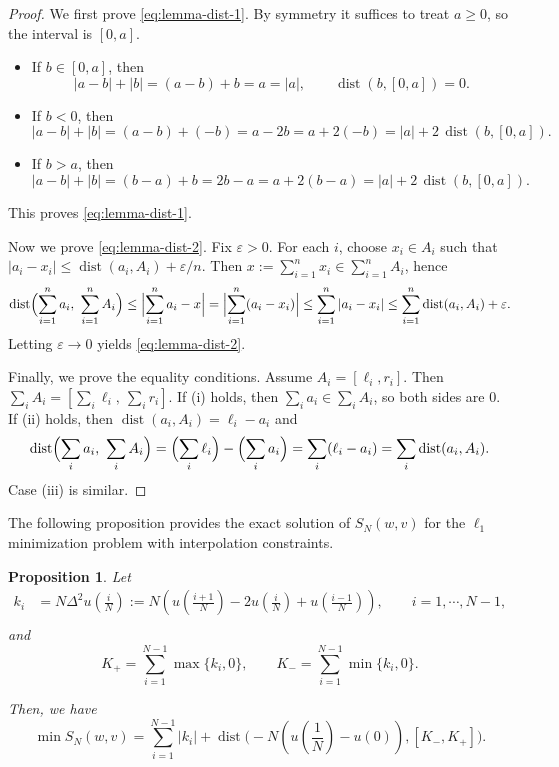 \documentclass[12pt]{amsart}
\numberwithin{equation}{section}
\newtheorem{proposition}{Proposition}[section]
\theoremstyle{remark}
\begin{document}
\begin{proof}
We first prove \eqref{eq:lemma-dist-1}.
By symmetry it suffices to treat $a\ge 0$, so the interval is $[0,a]$.
\begin{itemize}
\item If $b\in[0,a]$, then
\[
|a-b|+|b|=(a-b)+b=a=|a|,
\qquad
\operatorname{dist}(b,[0,a])=0.
\]
\item If $b<0$, then
\[
|a-b|+|b|=(a-b)+(-b)=a-2b=a+2(-b)
=|a|+2\,\operatorname{dist}(b,[0,a]).
\]
\item If $b>a$, then
\[
|a-b|+|b|=(b-a)+b=2b-a=a+2(b-a)
=|a|+2\,\operatorname{dist}(b,[0,a]).
\]
\end{itemize}
This proves \eqref{eq:lemma-dist-1}.

Now we prove \eqref{eq:lemma-dist-2}.
Fix $\varepsilon>0$. For each $i$, choose $x_i\in A_i$ such that
$|a_i-x_i|\le \operatorname{dist}(a_i,A_i)+\varepsilon/n$.
Then $x:=\sum_{i=1}^n x_i\in \sum_{i=1}^n A_i$, hence
\begin{equation}
\operatorname{dist}\Bigl(\sum_{i=1}^n a_i,\ \sum_{i=1}^n A_i\Bigr)
\le \Bigl|\sum_{i=1}^n a_i - x\Bigr|
= \Bigl|\sum_{i=1}^n (a_i-x_i)\Bigr|
\le \sum_{i=1}^n |a_i-x_i|
\le \sum_{i=1}^n \operatorname{dist}(a_i,A_i)+\varepsilon.
\end{equation}
Letting $\varepsilon\to 0$ yields \eqref{eq:lemma-dist-2}.

Finally, we prove the equality conditions.
Assume $A_i=[\ell_i,r_i]$. Then $\sum_i A_i=[\sum_i \ell_i,\ \sum_i r_i]$.
If (i) holds, then $\sum_i a_i\in \sum_i A_i$, so both sides are $0$.
If (ii) holds, then $\operatorname{dist}(a_i,A_i)=\ell_i-a_i$ and
\begin{equation}
\operatorname{dist}\Bigl(\sum_i a_i,\ \sum_i A_i\Bigr)
= \Bigl(\sum_i \ell_i\Bigr)-\Bigl(\sum_i a_i\Bigr)
= \sum_i (\ell_i-a_i)
= \sum_i \operatorname{dist}(a_i,A_i).
\end{equation}
Case (iii) is similar.
\end{proof}

The following proposition provides the exact solution of $S_N(w,v)$ for the $\ell_1$ minimization problem with interpolation constraints.

\begin{proposition}
\label{prop:min-Sn}
Let \begin{equation}
    \label{eq:k_i}
    \begin{aligned}
        k_i &= N\Delta^2 u(\frac{i}{N}):= N(u(\frac {i+1}{N})-2u(\frac i N)+u(\frac{i-1}{N})), \qquad i=1, \cdots, N-1,\\
    \end{aligned}
\end{equation}
and
\begin{equation}
    K_+ = \sum_{i=1}^{N-1} \max\{k_i, 0\}, \qquad K_- = \sum_{i=1}^{N-1} \min\{k_i, 0\}.
\end{equation}

Then, we have
\begin{equation}
\label{eq:min-Sn}
    \min S_N(w,v) = \sum_{i=1}^{N-1} |k_i| + \operatorname{dist}\Big(-N(u(\frac 1 N)-u(0)), [K_-, K_+] \Big).
\end{equation}

\end{proposition}
\end{document}
